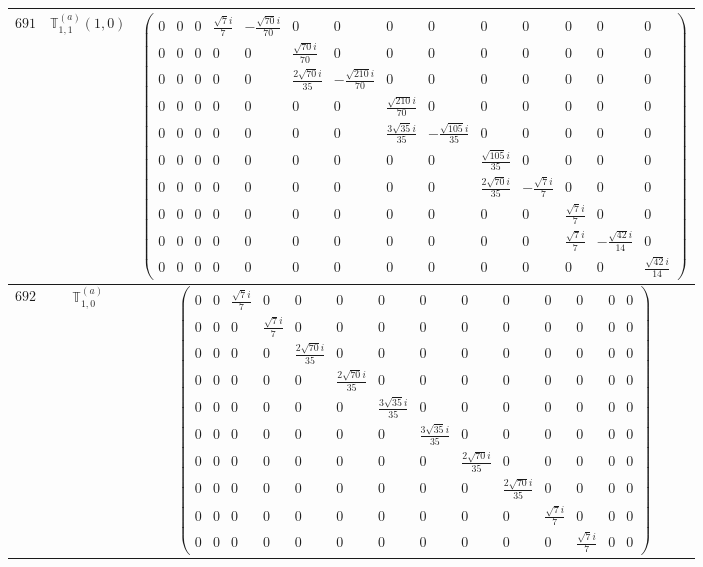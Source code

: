 \documentclass[fleqn,8pt,landscape]{jsarticle}
\begin{document}
\begin{center}
\begin{longtable}{ccc}
$ 691 $ & $ \mathbb{T}_{1,1}^{(a)}(1,0) $ & $ \begin{pmatrix} 0 & 0 & 0 & \frac{\sqrt{7} i}{7} & - \frac{\sqrt{70} i}{70} & 0 & 0 & 0 & 0 & 0 & 0 & 0 & 0 & 0 \\ 0 & 0 & 0 & 0 & 0 & \frac{\sqrt{70} i}{70} & 0 & 0 & 0 & 0 & 0 & 0 & 0 & 0 \\ 0 & 0 & 0 & 0 & 0 & \frac{2 \sqrt{70} i}{35} & - \frac{\sqrt{210} i}{70} & 0 & 0 & 0 & 0 & 0 & 0 & 0 \\ 0 & 0 & 0 & 0 & 0 & 0 & 0 & \frac{\sqrt{210} i}{70} & 0 & 0 & 0 & 0 & 0 & 0 \\ 0 & 0 & 0 & 0 & 0 & 0 & 0 & \frac{3 \sqrt{35} i}{35} & - \frac{\sqrt{105} i}{35} & 0 & 0 & 0 & 0 & 0 \\ 0 & 0 & 0 & 0 & 0 & 0 & 0 & 0 & 0 & \frac{\sqrt{105} i}{35} & 0 & 0 & 0 & 0 \\ 0 & 0 & 0 & 0 & 0 & 0 & 0 & 0 & 0 & \frac{2 \sqrt{70} i}{35} & - \frac{\sqrt{7} i}{7} & 0 & 0 & 0 \\ 0 & 0 & 0 & 0 & 0 & 0 & 0 & 0 & 0 & 0 & 0 & \frac{\sqrt{7} i}{7} & 0 & 0 \\ 0 & 0 & 0 & 0 & 0 & 0 & 0 & 0 & 0 & 0 & 0 & \frac{\sqrt{7} i}{7} & - \frac{\sqrt{42} i}{14} & 0 \\ 0 & 0 & 0 & 0 & 0 & 0 & 0 & 0 & 0 & 0 & 0 & 0 & 0 & \frac{\sqrt{42} i}{14} \end{pmatrix} $ \\ \hline
$ 692 $ & $ \mathbb{T}_{1,0}^{(a)} $ & $ \begin{pmatrix} 0 & 0 & \frac{\sqrt{7} i}{7} & 0 & 0 & 0 & 0 & 0 & 0 & 0 & 0 & 0 & 0 & 0 \\ 0 & 0 & 0 & \frac{\sqrt{7} i}{7} & 0 & 0 & 0 & 0 & 0 & 0 & 0 & 0 & 0 & 0 \\ 0 & 0 & 0 & 0 & \frac{2 \sqrt{70} i}{35} & 0 & 0 & 0 & 0 & 0 & 0 & 0 & 0 & 0 \\ 0 & 0 & 0 & 0 & 0 & \frac{2 \sqrt{70} i}{35} & 0 & 0 & 0 & 0 & 0 & 0 & 0 & 0 \\ 0 & 0 & 0 & 0 & 0 & 0 & \frac{3 \sqrt{35} i}{35} & 0 & 0 & 0 & 0 & 0 & 0 & 0 \\ 0 & 0 & 0 & 0 & 0 & 0 & 0 & \frac{3 \sqrt{35} i}{35} & 0 & 0 & 0 & 0 & 0 & 0 \\ 0 & 0 & 0 & 0 & 0 & 0 & 0 & 0 & \frac{2 \sqrt{70} i}{35} & 0 & 0 & 0 & 0 & 0 \\ 0 & 0 & 0 & 0 & 0 & 0 & 0 & 0 & 0 & \frac{2 \sqrt{70} i}{35} & 0 & 0 & 0 & 0 \\ 0 & 0 & 0 & 0 & 0 & 0 & 0 & 0 & 0 & 0 & \frac{\sqrt{7} i}{7} & 0 & 0 & 0 \\ 0 & 0 & 0 & 0 & 0 & 0 & 0 & 0 & 0 & 0 & 0 & \frac{\sqrt{7} i}{7} & 0 & 0 \end{pmatrix} $ \\ \hline

\end{longtable}
\end{center}
\end{document}
